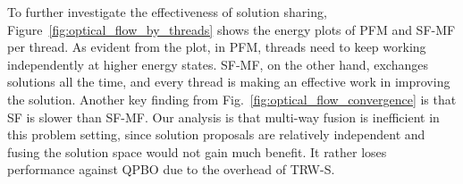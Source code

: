 % 
%
To further investigate the effectiveness of solution sharing,
Figure~\ref{fig:optical_flow_by_threads} shows the energy plots of PFM
and SF-MF per thread. As evident from the plot, in PFM, threads need to
keep working independently at higher energy states.
SF-MF, on the other hand, exchanges solutions all the time, and every
thread is making an effective work in improving the solution.
Another key finding from Fig.~\ref{fig:optical_flow_convergence} is that
SF is slower than SF-MF. Our analysis is that multi-way fusion is
inefficient in this problem setting, since solution proposals are
relatively independent and fusing the solution space would not gain much
benefit. It rather loses performance against QPBO due to the
overhead of TRW-S.

